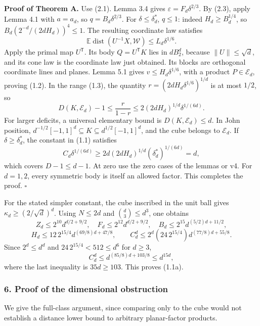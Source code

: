 \documentclass[
  11pt,
]{article}
\begin{document}
\textbf{Proof of Theorem A.} Use (2.1). Lemma 3.4 gives
\(\varepsilon=F_d\delta^{2/3}\). By (2.3), apply Lemma 4.1 with
\(a=a_d\), so \(q=B_d\delta^{2/3}\). For \(\delta\le\delta_d^*\),
\(q\le1\): indeed \(H_d\ge B_d^{1/4}\), so
\(B_d(2^{-d}/(2dH_d))^4\le1\). The resulting coordinate law satisfies \[
 \mathbb E\operatorname{dist}(U^{-1}X,\mathcal W)
 \le L_d\delta^{1/6}.
\] Apply the primal map \(U^{\mathsf T}\). Its body \(Q=U^{\mathsf T}K\)
lies in \(dB_2^d\), because \(\|U\|\le\sqrt d\), and its cone law is the
coordinate law just obtained. Its blocks are orthogonal coordinate lines
and planes. Lemma 5.1 gives \(v\le H_d\delta^{1/6}\), with a product
\(P\in\mathcal E_d\), proving (1.2). In the range (1.3), the quantity
\(r=(2dH_d\delta^{1/6})^{1/d}\) is at most \(1/2\), so \[
 D(K,\mathcal E_d)-1\le\frac r{1-r}
 \le2(2dH_d)^{1/d}\delta^{1/(6d)}.
\] For larger deficits, a universal elementary bound is
\(D(K,\mathcal E_d)\le d\). In John position,
\(d^{-1/2}[-1,1]^d\subseteq K\subseteq d^{1/2}[-1,1]^d\), and the cube
belongs to \(\mathcal E_d\). If \(\delta\ge\delta_d^*\), the constant in
(1.1) satisfies \[
 C_d\delta^{1/(6d)}\ge
 2d(2dH_d)^{1/d}(\delta_d^*)^{1/(6d)}=d,
\] which covers \(D-1\le d-1\). At zero use the zero cases of the lemmas
or v4. For \(d=1,2\), every symmetric body is itself an allowed factor.
This completes the proof. \(\square\)

For the stated simpler constant, the cube inscribed in the unit ball
gives \(\kappa_d\ge(2/\sqrt d)^d\). Using \(N\le2d\) and
\(\binom d3\le d^3\), one obtains \[
 Z_d\le2^{10}d^{d/2+9/2},\quad
 F_d\le2^{12}d^{d/2+9/2},\quad
 B_d\le2^{15}d^{(5/2)d+11/2},
\] \[
 H_d\le12\,2^{15/4}d^{(69/8)d+47/8},\qquad
 C_d^d\le2^d(24\,2^{15/4})d^{(77/8)d+55/8}.
\] Since \(2^d\le d^d\) and \(24\,2^{15/4}<512\le d^6\) for \(d\ge3\),
\[
 C_d^d\le d^{(85/8)d+103/8}\le d^{15d},
\] where the last inequality is \(35d\ge103\). This proves (1.1a).

\subsubsection{6. Proof of the dimensional
obstruction}\label{proof-of-the-dimensional-obstruction}

We give the full-class argument, since comparing only to the cube would
not establish a distance lower bound to arbitrary planar-factor
products.
\end{document}
